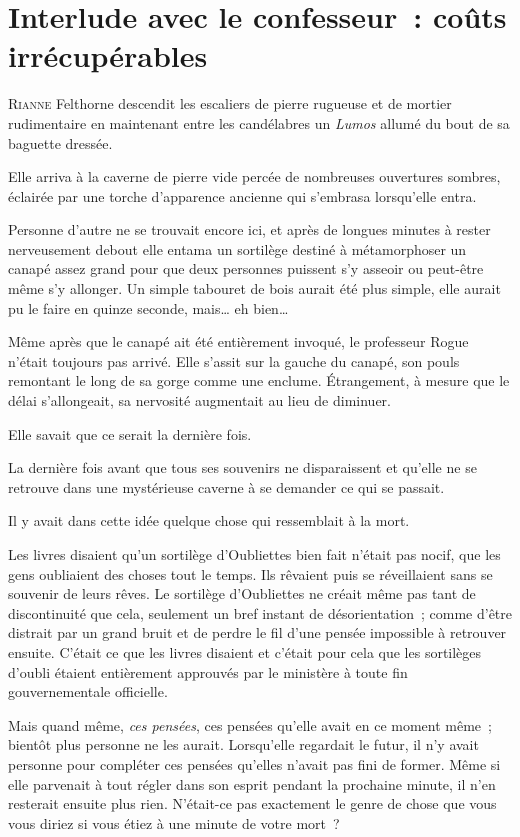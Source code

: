 \chapter{Interlude avec le confesseur~: coûts irrécupérables}

\lettrine{R}{ianne} Felthorne descendit les escaliers de pierre rugueuse et de mortier rudimentaire en maintenant entre les candélabres un \emph{Lumos} allumé du bout de sa baguette dressée.

Elle arriva à la caverne de pierre vide percée de nombreuses ouvertures sombres, éclairée par une torche d'apparence ancienne qui s'embrasa lorsqu'elle entra.

Personne d'autre ne se trouvait encore ici, et après de longues minutes à rester nerveusement debout elle entama un sortilège destiné à métamorphoser un canapé assez grand pour que deux personnes puissent s'y asseoir ou peut-être même s'y allonger. Un simple tabouret de bois aurait été plus simple, elle aurait pu le faire en quinze seconde, mais… eh bien…

Même après que le canapé ait été entièrement invoqué, le professeur Rogue n'était toujours pas arrivé. Elle s'assit sur la gauche du canapé, son pouls remontant le long de sa gorge comme une enclume. Étrangement, à mesure que le délai s'allongeait, sa nervosité augmentait au lieu de diminuer.

Elle savait que ce serait la dernière fois.

La dernière fois avant que tous ses souvenirs ne disparaissent et qu'elle ne se retrouve dans une mystérieuse caverne à se demander ce qui se passait.

Il y avait dans cette idée quelque chose qui ressemblait à la mort.

Les livres disaient qu'un sortilège d'Oubliettes bien fait n'était pas nocif, que les gens oubliaient des choses tout le temps. Ils rêvaient puis se réveillaient sans se souvenir de leurs rêves. Le sortilège d'Oubliettes ne créait même pas tant de discontinuité que cela, seulement un bref instant de désorientation~; comme d'être distrait par un grand bruit et de perdre le fil d'une pensée impossible à retrouver ensuite. C'était ce que les livres disaient et c'était pour cela que les sortilèges d'oubli étaient entièrement approuvés par le ministère à toute fin gouvernementale officielle.

Mais quand même, \emph{ces pensées}, ces pensées qu'elle avait en ce moment même~; bientôt plus personne ne les aurait. Lorsqu'elle regardait le futur, il n'y avait personne pour compléter ces pensées qu'elles n'avait pas fini de former. Même si elle parvenait à tout régler dans son esprit pendant la prochaine minute, il n'en resterait ensuite plus rien. N'était-ce pas exactement le genre de chose que vous vous diriez si vous étiez à une minute de votre mort~?

